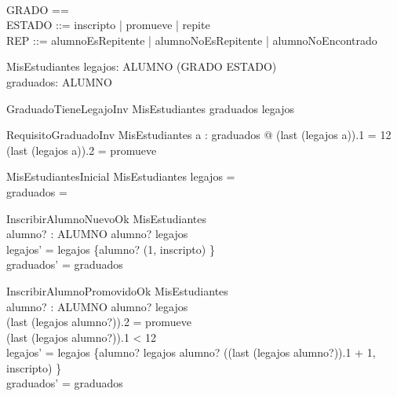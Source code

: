 \begin{zed}
    [ALUMNO] \\
    GRADO == \nat \\
    ESTADO ::= inscripto | promueve | repite \\
    REP ::= alumnoEsRepitente | alumnoNoEsRepitente | alumnoNoEncontrado
\end{zed}

\begin{schema}{MisEstudiantes}
    legajos: ALUMNO \pfun \seq (GRADO \cross ESTADO) \\
    graduados: \power ALUMNO
\end{schema}

\begin{schema}{GraduadoTieneLegajoInv}
    MisEstudiantes
    \where
    graduados \subseteq \dom legajos
\end{schema}

\begin{schema}{RequisitoGraduadoInv}
    MisEstudiantes
    \where
    \forall a : graduados @ (last \; (legajos \; a)).1 = 12 \land (last \; (legajos \; a)).2 = promueve
\end{schema}

\begin{schema}{MisEstudiantesInicial}
    MisEstudiantes
    \where
    legajos = \emptyset \\
    graduados = \emptyset
\end{schema}

\begin{schema}{InscribirAlumnoNuevoOk}
    \Delta MisEstudiantes \\
    alumno? : ALUMNO
    \where
    alumno? \notin \dom legajos \\
    legajos' = legajos \cup \{alumno? \mapsto \langle (1, inscripto) \rangle\} \\
    graduados' = graduados
\end{schema}

\begin{schema}{InscribirAlumnoPromovidoOk}
    \Delta MisEstudiantes \\
    alumno? : ALUMNO
    \where
    alumno? \in \dom legajos \\
    (last \; (legajos \; alumno?)).2 = promueve \\
    (last \; (legajos \; alumno?)).1 < 12 \\ 
    legajos' = legajos \oplus \{alumno? \mapsto legajos \; alumno? \cat \langle ((last \; (legajos \; alumno?)).1 + 1, inscripto) \rangle\} \\
    graduados' = graduados
\end{schema}

